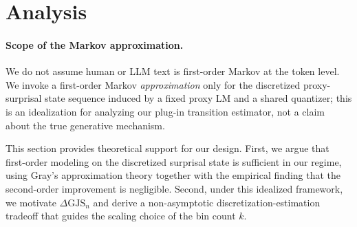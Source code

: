 \documentclass{article}
\theoremstyle{plain}
\theoremstyle{definition}
\theoremstyle{remark}
\begin{document}
\section{Analysis}


\paragraph{Scope of the Markov approximation.}
We do not assume human or LLM text is first-order Markov at the token level.
We invoke a first-order Markov \emph{approximation} only for the discretized proxy-surprisal state sequence induced by a fixed proxy LM and a shared quantizer; this is an idealization for analyzing our plug-in transition estimator, not a claim about the true generative mechanism.

This section provides theoretical support for our design. 
First, we argue that first-order modeling on the discretized surprisal state is sufficient in our regime, using Gray’s approximation theory together with the empirical finding that the second-order improvement is negligible.
Second, under this idealized framework, we motivate $\Delta \mathrm{GJS}_n$ and derive a non-asymptotic discretization-estimation tradeoff that guides the scaling choice of the bin count $k$.
\end{document}
